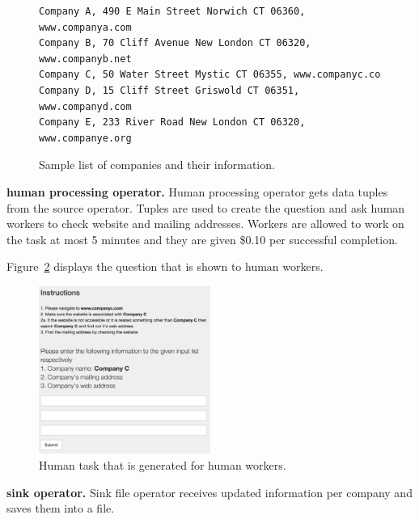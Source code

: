 \begin{figure}[ht]
	\centering
\begin{lstlisting}
Company A, 490 E Main Street Norwich CT 06360, www.companya.com
Company B, 70 Cliff Avenue New London CT 06320, www.companyb.net
Company C, 50 Water Street Mystic CT 06355, www.companyc.co
Company D, 15 Cliff Street Griswold CT 06351, www.companyd.com
Company E, 233 River Road New London CT 06320, www.companye.org
\end{lstlisting}
\caption{Sample list of companies and their information.}
	\label{fig:scenario1.list}
\end{figure}


\textbf{human processing operator.}
Human processing operator gets data tuples from the source operator. Tuples are used to create the question and ask human workers to check website and mailing addresses. Workers are allowed to work on the task at most 5 minutes and they are given \$0.10 per successful completion.

Figure~\ref{fig:scenario1.1h} displays the question that is shown to human workers.

\begin{figure}[ht]
	\centering
	\includegraphics[width=0.5\textwidth]{figures/scenarios/scenario1_1h.png}
	\caption{Human task that is generated for human workers.}
	\label{fig:scenario1.1h}
\end{figure}


\textbf{sink operator.}
Sink file operator receives updated information per company and saves them into a file.

